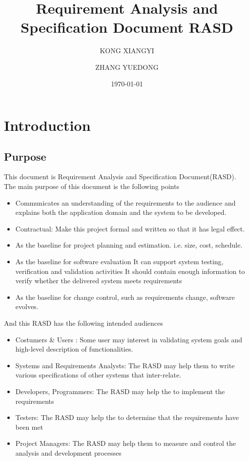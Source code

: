 \documentclass[a4paper,12pt]{report}
\begin{document}
 
	
\title{Requirement Analysis and Specification Document RASD}
\author{KONG XIANGYI\and ZHANG YUEDONG}
\date{\today}

\maketitle


\tableofcontents



\chapter{Introduction} \label{C1:Introduction}

\section{Purpose}
This document is Requirement Analysis and Specification Document(RASD). The main purpose of this document is the following points
\begin{itemize}
	\item Communicates an understanding of the requirements to the audience and explains both the application domain and the system to be developed.
	\item Contractual: Make this project formal and written so that it has legal effect.
	\item As the baseline for project planning and estimation. i.e. size, cost, schedule. 
	\item As the baseline for software evaluation
		\subitem It can support system testing, verification and validation activities
		\subitem It should contain enough information to verify whether the delivered system meets requirements
	\item As the baseline for change control, such as requirements change, software evolves.
\end{itemize}
And this RASD has the following intended audiences
\begin{itemize}
	\item Costumers \& Users : Some user may interest in validating system goals and high-level description of functionalities.
	\item Systems and Requirements Analysts: The RASD may help them to write various specifications of other systems that inter-relate.
	\item Developers, Programmers: The RASD may help the to implement the requirements
	\item Testers: The RASD may help the to determine that the requirements have been met
	\item Project Managers: The RASD may help them to measure and control the analysis and development processes
\end{itemize}
\end{document}
